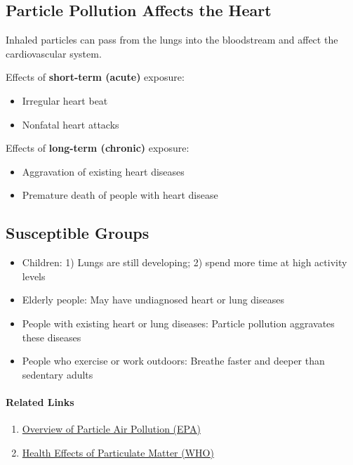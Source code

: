 \documentclass{article}
\begin{document}
\subsection{Particle Pollution Affects the Heart}

Inhaled particles can pass from the lungs into the bloodstream and affect the cardiovascular system.

Effects of \textbf{short-term (acute)} exposure:
\begin{itemize}
    \item Irregular heart beat
    \item Nonfatal heart attacks
\end{itemize}

Effects of \textbf{long-term (chronic)} exposure:
\begin{itemize}
    \item Aggravation of existing heart diseases
    \item Premature death of people with heart disease
\end{itemize}

\subsection{Susceptible Groups}
\begin{itemize}
    \item Children: 1) Lungs are still developing; 2) spend more time at high activity levels
    \item Elderly people: May have undiagnosed heart or lung diseases
    \item People with existing heart or lung diseases: Particle pollution aggravates these diseases
    \item People who exercise or work outdoors: Breathe faster and deeper than sedentary adults
\end{itemize}

\paragraph{Related Links}

\begin{enumerate}
    \item \href{https://www.epa.gov/sites/production/files/2014-05/documents/huff-particle.pdf}{Overview of Particle Air Pollution (EPA)}
    \item \href{http://www.euro.who.int/__data/assets/pdf_file/0006/189051/Health-effects-of-particulate-matter-final-Eng.pdf}{Health Effects of Particulate Matter (WHO)}
\end{enumerate}
\end{document}
